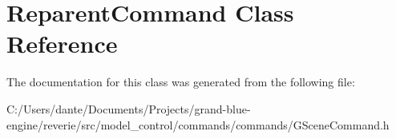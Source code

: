 \hypertarget{class_reparent_command}{}\section{Reparent\+Command Class Reference}
\label{class_reparent_command}


The documentation for this class was generated from the following file\+:\begin{DoxyCompactItemize}
\item 
C\+:/\+Users/dante/\+Documents/\+Projects/grand-\/blue-\/engine/reverie/src/model\+\_\+control/commands/commands/G\+Scene\+Command.\+h\end{DoxyCompactItemize}
